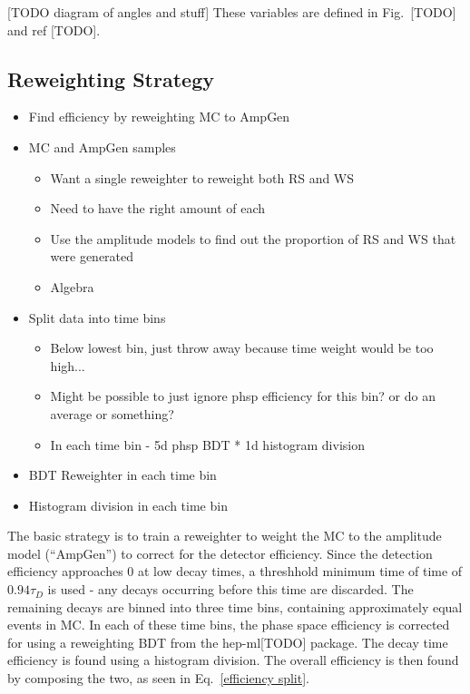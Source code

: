 \documentclass[note.tex]{subfiles}
\begin{document}
[TODO diagram of angles and stuff] These variables are defined in Fig.~[TODO] and ref [TODO].


\subsection{Reweighting Strategy}
\begin{itemize}
    \item Find efficiency by reweighting MC to AmpGen
    \item MC and AmpGen samples
          \begin{itemize}
              \item Want a single reweighter to reweight both RS and WS
              \item Need to have the right amount of each
              \item Use the amplitude models to find out the proportion of RS and WS that were generated
              \item Algebra
          \end{itemize}
    \item Split data into time bins
          \begin{itemize}
              \item Below lowest bin, just throw away because time weight would be too high...
              \item Might be possible to just ignore phsp efficiency for this bin? or do an average or something?
              \item In each time bin - 5d phsp BDT * 1d histogram division
          \end{itemize}
    \item BDT Reweighter in each time bin
    \item Histogram division in each time bin
\end{itemize}
The basic strategy is to train a reweighter to weight the MC to the amplitude model (``AmpGen'') to correct for the detector efficiency.
Since the detection efficiency approaches 0 at low decay times, a threshhold minimum time of time of $0.94\tau_D$ is used - any decays occurring before this time are discarded.
The remaining decays are binned into three time bins, containing approximately equal events in MC.
In each of these time bins, the phase space efficiency is corrected for using a reweighting BDT from the hep-ml[TODO] package.
The decay time efficiency is found using a histogram division.
The overall efficiency is then found by composing the two, as seen in Eq.~\ref{efficiency split}.
\end{document}
